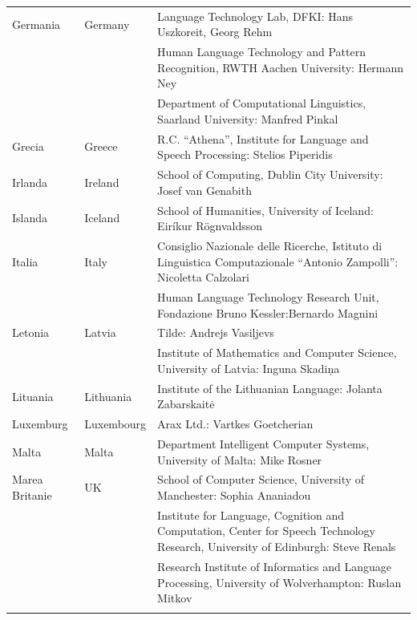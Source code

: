 \begin{longtable}{@{}llp{113mm}@{}}
  Germania & \textcolor{grey1}{Germany} & Language Technology Lab, DFKI: Hans Uszkoreit, Georg Rehm\\ \addlinespace
  & & Human Language Technology and Pattern Recognition, RWTH Aachen University: Hermann Ney \\ \addlinespace
  & & Department of Computational Linguistics, Saarland University: Manfred Pinkal\\ \addlinespace 
  Grecia & \textcolor{grey1}{Greece} & R.C. “Athena”, Institute for Language and Speech Processing: Stelios Piperidis\\ \addlinespace
  Irlanda & \textcolor{grey1}{Ireland} & School of Computing, Dublin City University: Josef van Genabith\\ \addlinespace
  Islanda & \textcolor{grey1}{Iceland} & School of Humanities, University of Iceland: Eiríkur Rögnvaldsson\\ \addlinespace
  Italia & \textcolor{grey1}{Italy} & Consiglio Nazionale delle Ricerche, Istituto di Linguistica Computazionale “Antonio Zampolli”: Nicoletta Calzolari\\ \addlinespace
& & Human Language Technology Research Unit, Fondazione Bruno Kessler:\newline Bernardo Magnini\\ \addlinespace 
  Letonia & \textcolor{grey1}{Latvia} & Tilde: Andrejs Vasiļjevs\\ \addlinespace 
  & & Institute of Mathematics and Computer Science, University of Latvia: Inguna Skadiņa\\ \addlinespace
  Lituania & \textcolor{grey1}{Lithuania} & Institute of the Lithuanian Language: Jolanta Zabarskaitė\\ \addlinespace
  Luxemburg & \textcolor{grey1}{Luxembourg} & Arax Ltd.: Vartkes Goetcherian\\ \addlinespace
  Malta & \textcolor{grey1}{Malta} & Department Intelligent Computer Systems, University of Malta: Mike Rosner\\ \addlinespace
  Marea Britanie & \textcolor{grey1}{UK} & School of Computer Science, University of Manchester: Sophia Ananiadou \\ \addlinespace 
  & & Institute for Language, Cognition and Computation, Center for Speech Technology Research, University of Edinburgh: Steve Renals \\ \addlinespace 
  & & Research Institute of Informatics and Language Processing, University of Wolverhampton: Ruslan Mitkov \\ \addlinespace 

\end{longtable}
